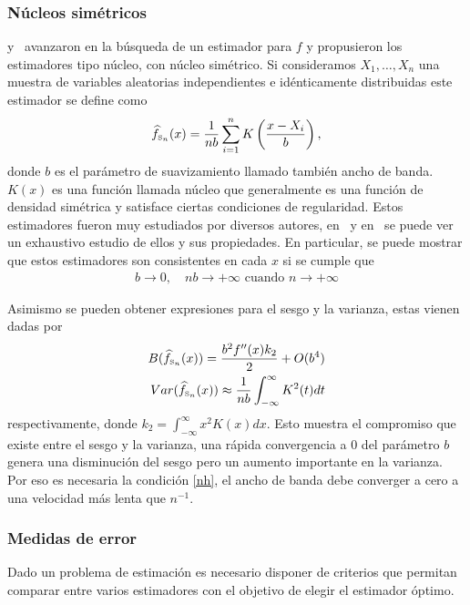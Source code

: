 \subsubsection{Núcleos simétricos}
\citet{Rosenblatt56} y~\citet{Parzen62} avanzaron en la búsqueda de un estimador para $f$ y propusieron los estimadores tipo núcleo, con núcleo simétrico. Si consideramos $X_1,\ldots,X_n$ una muestra de variables aleatorias independientes e idénticamente distribuidas este estimador se define como
\begin{align}
\label{KS}
\widehat{f}_{\text{\tiny{S}}_n}(x)=\frac{1}{n b} \sum_{i=1}^n K \left(\dfrac{x-X_i}{b}\right),
\end{align}
donde $b$ es el parámetro de suavizamiento llamado también ancho de banda. $K(x)$ es una función llamada núcleo que generalmente es una función de densidad simétrica y satisface ciertas condiciones de regularidad. Estos estimadores fueron muy estudiados por diversos autores, en~\citet{Silverman1986} y en~\citet{Scott1992} se puede ver un exhaustivo estudio de ellos y sus propiedades. En particular, se puede mostrar que estos estimadores son consistentes en cada $x$ si se cumple que  
\begin{align}
\label{nh}
b \to 0,  \quad nb \to +\infty \text{ cuando } n \to +\infty
\end{align}	

Asimismo se pueden obtener expresiones para el sesgo y la varianza, estas vienen dadas por
\begin{align}
\label{SesgoVar}
B(\widehat{f}_{\text{\tiny{S}}_n}(x))=\dfrac{b^2 f''(x) k_2}{2}+O(b^4)\\
Var(\widehat{f}_{\text{\tiny{S}}_n}(x))\approx \dfrac{1}{nb} \int_{-\infty}^{\infty} K^2(t)dt
\end{align}	
respectivamente, donde $k_2=\displaystyle{\int_{-\infty}^{\infty}} x^2 K(x)dx$. Esto muestra el compromiso que existe entre el sesgo y la varianza, una rápida convergencia a $0$ del parámetro $b$ genera una disminución del sesgo pero un aumento importante en la varianza. Por eso es necesaria la condición \eqref{nh}, el ancho de banda debe converger a cero a una velocidad más lenta que $n^{-1}.$ 

\subsubsection{Medidas de error}

Dado un problema de estimación es necesario disponer de criterios que permitan comparar entre varios estimadores con el objetivo de elegir el estimador óptimo. 

